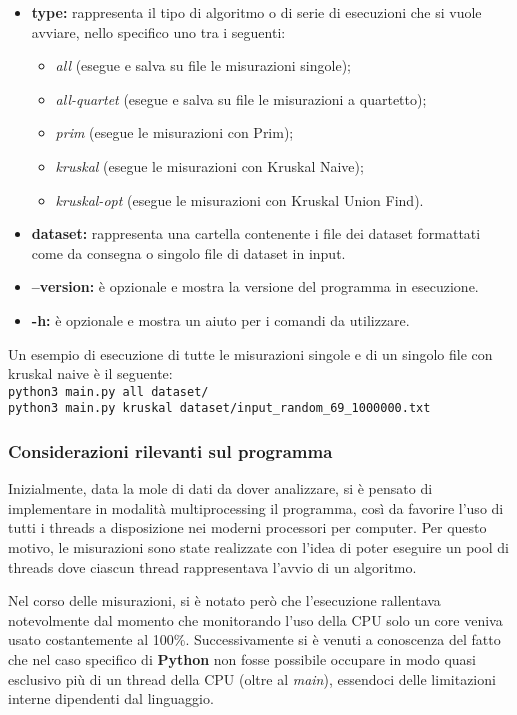 \begin{itemize}
    \item \textbf{type:} rappresenta il tipo di algoritmo o di serie di esecuzioni che si vuole avviare, nello specifico uno tra i seguenti: 
    \begin{itemize}
        \item \textit{all} (esegue e salva su file le misurazioni singole);
        \item \textit{all-quartet} (esegue e salva su file le misurazioni a quartetto);        \item \textit{prim} (esegue le misurazioni con Prim);
        \item \textit{kruskal} (esegue le misurazioni con Kruskal Naive);
        \item \textit{kruskal-opt} (esegue le misurazioni con Kruskal Union Find).   
    \end{itemize} 
    \item \textbf{dataset:} rappresenta una cartella contenente i file dei dataset formattati come da consegna o singolo file di dataset in input. 
    \item \textbf{--version:} è opzionale e mostra la versione del programma in esecuzione. 
    \item \textbf{-h:} è opzionale e mostra un aiuto per i comandi da utilizzare. 
\end{itemize}

\noindent Un esempio di esecuzione di tutte le misurazioni singole e di un singolo file con kruskal naive è il seguente: \\
\texttt{python3 main.py all dataset/} \\
\texttt{python3 main.py kruskal dataset/input\_random\_69\_1000000.txt}

\subsubsection{Considerazioni rilevanti sul programma}

Inizialmente, data la mole di dati da dover analizzare, si è pensato di implementare in modalità multiprocessing il programma, così da favorire l'uso di tutti i threads a disposizione nei moderni processori per computer. Per questo motivo, le misurazioni sono state realizzate con l'idea di poter eseguire un pool di threads dove ciascun thread rappresentava l'avvio di un algoritmo. 

Nel corso delle misurazioni, si è notato però che l'esecuzione rallentava notevolmente dal momento che monitorando l'uso della CPU solo un core veniva usato costantemente al 100\%. Successivamente si è venuti a conoscenza del fatto che nel caso specifico di \textbf{Python} non fosse possibile occupare in modo quasi esclusivo più di un thread della CPU (oltre al \textit{main}), essendoci delle limitazioni interne dipendenti dal linguaggio.

